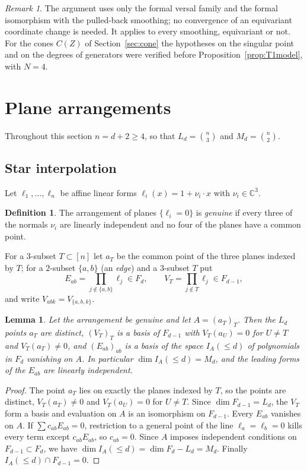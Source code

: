 \documentclass{amsart}
\newtheorem{lemma}[theorem]{Lemma}
\theoremstyle{definition}
\newtheorem{definition}[theorem]{Definition}
\theoremstyle{remark}
\newtheorem{remark}[theorem]{Remark}
\numberwithin{equation}{section}
\newcommand{\CC}{\mathbb{C}}
\begin{document}
\begin{remark}\label{rem:formal}
The argument uses only the formal versal family and the formal isomorphism with the
pulled-back smoothing; no convergence of an equivariant coordinate change is
needed. It applies to every smoothing, equivariant or not. For the cones $C(Z)$ of
Section~\ref{sec:cone} the hypotheses on the singular point and on the degrees of
generators were verified before Proposition~\ref{prop:T1model}, with $N=4$.
\end{remark}

\section{Plane arrangements}\label{sec:star}

Throughout this section $n=d+2\ge 4$, so that $L_d=\binom n3$ and $M_d=\binom n2$.

\subsection{Star interpolation}
Let $\ell_1,\dots,\ell_n$ be affine linear forms $\ell_i(x)=1+\nu_i\cdot x$ with
$\nu_i\in\CC^3$.

\begin{definition}\label{def:genuine}
The arrangement of planes $\{\ell_i=0\}$ is \emph{genuine} if every three of the normals
$\nu_i$ are linearly independent and no four of the planes have a common point.
\end{definition}

For a $3$-subset $T\subset[n]$ let $a_T$ be the common point of the three planes
indexed by $T$; for a $2$-subset $\{a,b\}$ (an \emph{edge}) and a $3$-subset $T$ put
\[
  E_{ab}=\prod_{j\notin\{a,b\}}\ell_j\in F_d,\qquad
  V_T=\prod_{j\notin T}\ell_j\in F_{d-1},
\]
and write $V_{abk}=V_{\{a,b,k\}}$.

\begin{lemma}\label{lem:star}
Let the arrangement be genuine and let $A=(a_T)_T$. Then the $L_d$ points $a_T$ are
distinct, $(V_T)_T$ is a basis of $F_{d-1}$ with $V_T(a_U)=0$ for $U\ne T$ and
$V_T(a_T)\ne0$, and $(E_{ab})_{ab}$ is a basis of the space $I_A(\le d)$ of
polynomials in $F_d$ vanishing on $A$. In particular $\dim I_A(\le d)=M_d$, and the
leading forms of the $E_{ab}$ are linearly independent.
\end{lemma}

\begin{proof}
The point $a_T$ lies on exactly the planes indexed by $T$, so the points are
distinct, $V_T(a_T)\ne0$ and $V_T(a_U)=0$ for $U\ne T$. Since $\dim F_{d-1}=L_d$, the
$V_T$ form a basis and evaluation on $A$ is an isomorphism on $F_{d-1}$. Every
$E_{ab}$ vanishes on $A$. If $\sum c_{ab}E_{ab}=0$, restriction to a general point
of the line $\ell_a=\ell_b=0$ kills every term except $c_{ab}E_{ab}$, so $c_{ab}=0$.
Since $A$ imposes independent conditions on $F_{d-1}\subset F_d$, we have
$\dim I_A(\le d)=\dim F_d-L_d=M_d$. Finally $I_A(\le d)\cap F_{d-1}=0$.
\end{proof}
\end{document}
